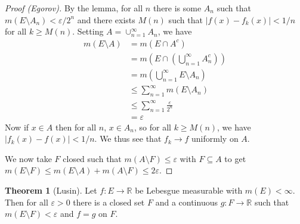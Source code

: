 \documentclass{article}
\newcommand{\R}{\mathbb{R}}
\theoremstyle{definition} %
\newtheorem{thm}{Theorem}
\numberwithin{thm}{section} %
\theoremstyle{definition} %
\begin{document}
\begin{proof}[Proof (Egorov)]
By the lemma, for all $n$ there is some $A_n$ such that $m(E \setminus A_n) < \varepsilon / 2^n$ and there exists $M(n)$ such that $|f(x) - f_k(x)| < 1/n$ for all $k \geq M(n)$. Setting $A = \cup_{n = 1}^\infty A_n$, we have
\begin{align*}
    m(E \setminus A) 
    &= m(E \cap A^c) \\ 
    &= m\left(E \cap \left(\bigcup_{n = 1}^\infty A_n^c\right)\right) \\
    &= m\left(\bigcup_{n = 1}^\infty E \setminus A_n\right) \\
    &\leq \sum_{n = 1}^\infty m(E \setminus A_n) \\
    &\leq \sum_{n = 1}^\infty \frac{\varepsilon}{2^n} \\
    &= \varepsilon
\end{align*}
Now if $x \in A$ then for all $n$, $x \in A_n$, so for all $k \geq M(n)$, we have $|f_k(x) - f(x)| < 1/n$. We thus see that $f_k \to f$ uniformly on $A$.

We now take $F$ closed such that $m(A \setminus F) \leq \varepsilon$ with $F \subseteq A$ to get $m(E \setminus F) \leq m(E \setminus A) + m(A \setminus F) \leq 2\varepsilon$.
\end{proof}

\begin{thm}[Lusin]
    Let $f: E \to \R$ be Lebesgue measurable with $m(E) < \infty$. Then for all $\varepsilon > 0$ there is a closed set $F$ and a continuous $g: F \to \R$ such that $m(E \setminus F) < \varepsilon$ and $f = g$ on $F$.
\end{thm}
\end{document}

